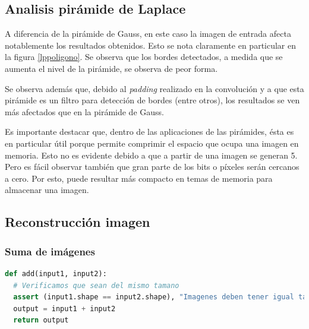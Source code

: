 \documentclass[12pt, letterpaper]{article}
\begin{document}
\subsection{Analisis pirámide de Laplace}
A diferencia de la pirámide de Gauss, en este caso la imagen de entrada afecta notablemente los resultados obtenidos. Esto se nota claramente en particular en la figura \ref{lppoligono}. Se observa que los bordes detectados, a medida que se aumenta el nivel de la pirámide, se observa de peor forma. 

\par Se observa además que, debido al \textit{padding} realizado en la convolución y a que esta pirámide es un filtro para detección de bordes (entre otros),  los resultados se ven más afectados que en la pirámide de Gauss. 

\par Es importante destacar que, dentro de las aplicaciones de las pirámides, ésta es en particular útil porque permite comprimir el espacio que ocupa una imagen en memoria. Esto no es evidente debido a que a partir de una imagen se generan 5. Pero es fácil observar también que gran parte de los bits o píxeles serán cercanos a cero. Por esto, puede resultar más compacto en temas de memoria para almacenar una imagen. \cite{paperPyramids}



\subsection{Reconstrucción imagen}
\subsubsection{Suma de imágenes}
\begin{lstlisting}[language=Python, label = addCode, caption=Función suma de imágenes.]
def add(input1, input2):
  # Verificamos que sean del mismo tamano
  assert (input1.shape == input2.shape), "Imagenes deben tener igual tamano"
  output = input1 + input2
  return output
\end{lstlisting}
\end{document}
